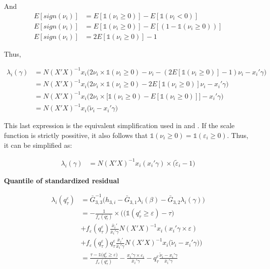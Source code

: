 \documentclass[
  authoryear,
  review,
  1p]{elsarticle}
\begin{document}
And \[\begin{aligned}
E[sign(\nu_i)] &= E[\mathbb{1}(\nu_i \geq 0)] - E[\mathbb{1}(\nu_i < 0)] \\
E[sign(\nu_i)] &= E[\mathbb{1}(\nu_i \geq 0)] - E[(1-\mathbb{1}(\nu_i \geq 0))] \\
E[sign(\nu_i)] &= 2 E[\mathbb{1}(\nu_i \geq 0)] - 1
\end{aligned}
\]

Thus,

\[\begin{aligned}
\lambda_i(\gamma) &= N(X'X)^{-1} x_i   \Big( 2 \nu_i \times \mathbb{1}(\nu_i \geq 0) - \nu_i  - ( 2 E[\mathbb{1}(\nu_i \geq 0)] - 1) \nu_i -x_i' \gamma \Big) \\
  &= N(X'X)^{-1} x_i   \Big( 2 \nu_i \times \mathbb{1}(\nu_i \geq 0) -  2 E[\mathbb{1}(\nu_i \geq 0)] \nu_i -x_i' \gamma \Big) \\
  &= N(X'X)^{-1} x_i   \Big( 2 \nu_i \times \big[ \mathbb{1}(\nu_i \geq 0) -  E[\mathbb{1}(\nu_i \geq 0)] \big] -x_i'\gamma \Big) \\
  &= N(X'X)^{-1} x_i   \Big( \tilde \nu_i -x_i' 
  \gamma \Big)
\end{aligned}
\]

This last expression is the equivalent simplification used in
\citet{mss2019} and \citet{im2000}. If the scale function is strictly
possitive, it also follows that
\(\mathbb{1}(\nu_i \geq 0)= \mathbb{1}(\varepsilon_i \geq 0)\). Thus, it
can be simplified as:

\[\begin{aligned}
\lambda_i(\gamma) &= N(X'X)^{-1} x_i ( x_i' \gamma ) \times (\tilde \varepsilon_i -1\big)
\end{aligned}
\]

\textbf{Quantile of standardized residual}

\[\begin{aligned}
\lambda_i(q^\varepsilon_\tau)&=\bar G_{3,3}^{-1}
\Big(
 h_{3,i}-\bar G_{3,1} \lambda_i(\beta)-\bar G_{3,2} \lambda_i(\gamma)
\Big) \\
&=-\frac{1}{f_{\varepsilon}(q^\varepsilon_\tau)} \times \Bigg( \Big(\mathbb{1} ( q^\varepsilon_\tau  \geq \varepsilon  ) - \tau \Big)  \\
&+ f_{\varepsilon} (q^\varepsilon_\tau) \frac{\bar x_i'}{\bar x_i'\gamma} 
N (X'X)^{-1} x_i  ( x_i'\gamma \times \varepsilon) \\
&+ f_{\varepsilon}(q^\varepsilon_\tau) q^\varepsilon_\tau \frac{\bar x_i'}{\bar x_i'\gamma} N(X'X)^{-1} x_i   \big( \tilde \nu_i -x_i' 
  \gamma \big) 
\Bigg) \\
&=\frac{\tau-\mathbb{1}\big( q^\varepsilon_\tau  \geq \varepsilon  \big) }{f_{\varepsilon}(q^\varepsilon_\tau)}
- \frac{ x_i'\gamma \times \varepsilon_i }{\bar x_i'\gamma} 
-  q^\varepsilon_\tau \frac{ \tilde \nu_i -x_i' 
  \gamma }{\bar x_i'\gamma} 
\end{aligned}
\]
\end{document}

